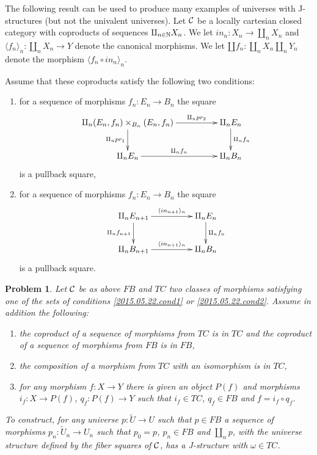\documentclass[12pt]{article}
\numberwithin{equation}{section}
\newtheorem{problem}[proposition]{Problem}
\newcommand{\llabel}[1]{\label{#1}}
\newcommand{\sr}{\rightarrow}
\newcommand{\nn}{{\mathbb N\rm}}
\newcommand{\wt}{\widetilde}
\begin{document}
The following result can be used to produce many examples of universes with
J-structures (but not the univalent universes). Let $\cal C$ be a locally
cartesian closed category with coproducts of sequences
$\amalg_{n\in\nn}X_n$. We let $in_n:X_n\sr \amalg_n X_n$ and $\langle f_n
\rangle_{n} : \amalg_n X_n\sr Y$ denote the canonical morphisms. We let $\amalg
f_n : \amalg_n X_n \amalg_n Y_n$ denote the morphism $\langle f_n\circ in_n
\rangle_{n}$.

Assume that these coproducts satisfy the following two conditions:
%
\begin{enumerate}
\item for a sequence of morphisms $f_n:E_n\sr B_n$ the square
%
$$
\begin{xy}
          \xymatrix@C=4pc{ \amalg_n (E_n,f_n)\times_{B_n}(E_n,f_n)
            \ar[r]^-{\amalg_n pr_2} \ar[d]_{\amalg_n pr_1} & \amalg_n E_n
            \ar[d]^{\amalg_n f_n}\\ \amalg_n E_n \ar[r]^-{\amalg_n f_n} &
            \amalg_n B_n }
\end{xy}
$$
%
is a pullback square,
%
\item for a sequence of morphisms $f_n:E_n\sr B_n$ the square
%
$$
\begin{xy}
          \xymatrix@C=4pc{ \amalg_n E_{n+1} \ar[r]^-{\langle in_{n+1}
              \rangle_{n}} \ar[d]_{\amalg_n f_{n+1}} & \amalg_n E_n
            \ar[d]^{\amalg_n f_n}\\ \amalg_n B_{n+1} \ar[r]^-{\langle in_{n+1}
              \rangle_{n}} & \amalg_n B_n }
\end{xy}
$$
%
is a pullback square.
\end{enumerate}
%
%
\begin{problem}
\llabel{2015.05.22.th2} Let $\cal C$ be as above $FB$ and $TC$ two classes of
morphisms satisfying one of the sets of conditions \ref{2015.05.22.cond1} or
\ref{2015.05.22.cond2}. Assume in addition the following:
%
\begin{enumerate}
\item the coproduct of a sequence of morphisms from $TC$ is in $TC$ and the
  coproduct of a sequence of morphisms from $FB$ is in $FB$,
\item the composition of a morphism from $TC$ with an isomorphism is in $TC$,
\item for any morphism $f: X \sr Y$ there is given an object $P(f)$ and
  morphisms $i_f:X\sr P(f)$, $q_f:P(f)\sr Y$ such that $i_f\in TC$, $q_f\in FB$
  and $f=i_f\circ q_f$.
\end{enumerate}
%
To construct, for any universe $p: \wt{U}\sr U$ such that $p\in FB$ a sequence
of morphisms $p_n:\wt{U}_n\sr U_n$ such that $p_0=p$, $p_n\in FB$ and $\amalg_n
p$, with the universe structure defined by the fiber squares of $\cal C$, has a
J-structure with $\omega\in TC$.
\end{problem}
\end{document}
